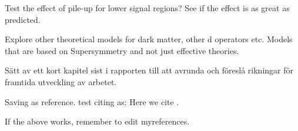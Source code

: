 Test the effect of pile-up for lower signal regions? See if the effect is as great as predicted. 

Explore other theoretical models for dark matter, other d operators etc. Models that are based on Supersymmetry and not just effective theories.



Sätt av ett kort kapitel sist i rapporten till att avrunda och föreslå rikningar för framtida utveckling av arbetet.


Saving as reference.
test citing as: Here we cite \citet{Duck:2005} \citep{Duck:2005}.

If the above works, remember to edit myreferences.
